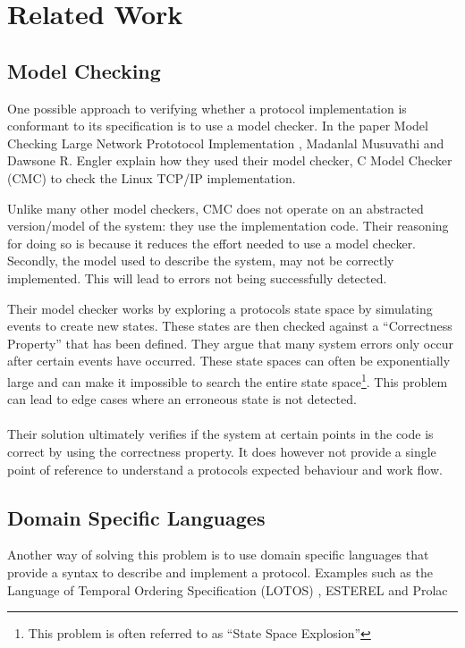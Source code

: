 \section{Related Work}
\subsection{Model Checking}
One possible approach to verifying whether a protocol implementation is conformant to its specification is to use a model checker. In the paper Model Checking Large Network Prototocol Implementation \cite{musuvathi2004model}, Madanlal Musuvathi and Dawsone R. Engler explain how they used their model checker, C Model Checker (CMC) \cite{musuvathi2002cmc} to check the Linux TCP/IP implementation. 

Unlike many other model checkers, CMC does not operate on an abstracted version/model of the system: they use the implementation code. Their reasoning for doing so is because it reduces the effort needed to use a model checker. Secondly, the model used to describe the system, may not be correctly implemented. This will lead to errors not being successfully detected. 

Their model checker works by exploring a protocols state space by simulating events to create new states. These states are then checked against a ``Correctness Property'' that has been defined. They argue that many system errors only occur after certain events have occurred. These state spaces can often be exponentially large and can make it impossible to search the entire state space\footnote{This problem is often referred to as ``State Space Explosion''}. This problem can lead to edge cases where an erroneous state is not detected.
\\\\
Their solution ultimately verifies if the system at certain points in the code is correct by using the correctness property. It does however not provide a single point of reference to understand a protocols expected behaviour and work flow.


\subsection{Domain Specific Languages}
Another way of solving this problem is to use domain specific languages that provide a syntax to describe and implement a protocol. Examples such as the Language of Temporal Ordering Specification  (LOTOS) \cite{bolognesi1987introduction}, ESTEREL \cite{boussinot1991esterel} and Prolac \cite{kohler1999readable}


